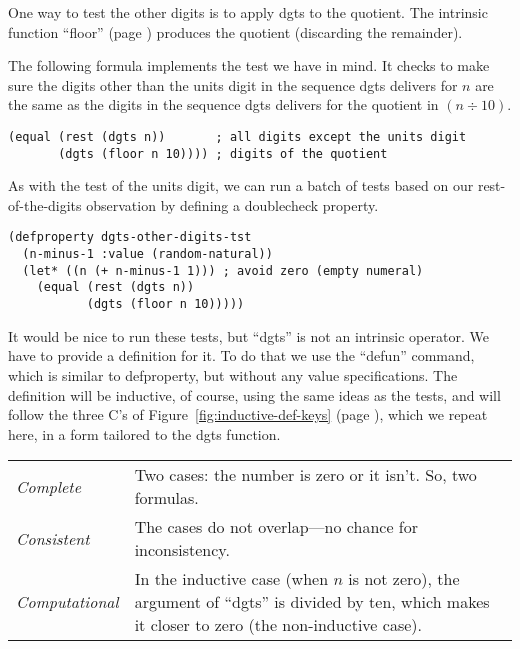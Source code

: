 
One way to test the other digits is to apply dgts to the quotient.
The intrinsic function ``floor'' (page \pageref{floor-def})
produces the quotient (discarding the remainder).

The following formula implements the test we have in mind.
It checks to make sure the digits other than the units digit
in the sequence dgts delivers for $n$
are the same as the digits in the sequence
dgts delivers for the quotient in $(n \div 10)$.
\begin{Verbatim}
(equal (rest (dgts n))       ; all digits except the units digit
       (dgts (floor n 10)))) ; digits of the quotient
\end{Verbatim}

As with the test of the units digit,
we can run a batch of tests based on our rest-of-the-digits
observation by defining a doublecheck property.
\begin{Verbatim}
(defproperty dgts-other-digits-tst
  (n-minus-1 :value (random-natural))
  (let* ((n (+ n-minus-1 1))) ; avoid zero (empty numeral)
    (equal (rest (dgts n))
           (dgts (floor n 10)))))
\end{Verbatim}

It would be nice to run these tests, but ``dgts'' is not an intrinsic operator.
We have to provide a definition for it.
To do that we use the ``defun'' command, which is similar to defproperty,
but without any value specifications. The definition will be inductive,
of course, using the same ideas as the tests,
and will follow the three C's of Figure~\ref{fig:inductive-def-keys}
(page \pageref{fig:inductive-def-keys}), which we repeat here,
in a form tailored to the dgts function.
\begin{samepage}
\begin{center}
\begin{tabular}{lp{3.5in}}
\emph{Complete}      & Two cases: the number is zero or it isn't. So, two formulas.\\
\emph{Consistent}    & The cases do not overlap---no chance for inconsistency.\\
\emph{Computational} & In the inductive case (when $n$ is not zero), the argument of
                       ``dgts'' is divided by ten, which makes it closer to zero
                       (the non-inductive case).
\end{tabular}
\end{center}
\end{samepage}

